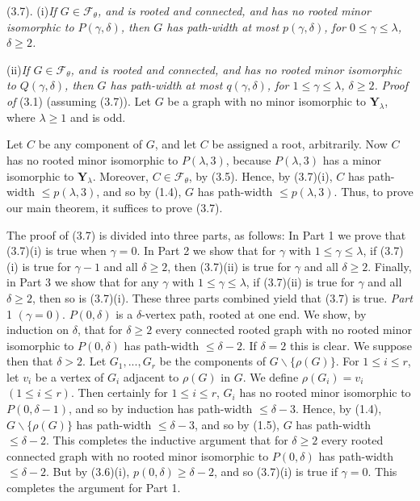 (3.7). (i)\enspace\textit{If $G\in\mathscr{F}_\theta$, and is rooted and connected, and has no rooted
minor isomorphic to $P(\gamma, \delta)$, then $G$ has path-width at most $p(\gamma, \delta)$, for
$0\le\gamma\le\lambda$, $\delta\ge 2$.}

\hspace*{12pt}(ii)\enspace\textit{If $G\in\mathscr{F}_\theta$, and is rooted and connected, and has no rooted minor
isomorphic to $Q(\gamma, \delta)$, then $G$ has path-width at most $q(\gamma, \delta)$, for $1\le\gamma\le\lambda$,
$\delta\ge 2$.}
\stmt
\textit{Proof of} (3.1) (assuming (3.7)). Let $G$ be a graph with no minor
isomorphic to $\mathbf{Y}_\lambda$, where $\lambda\ge 1$ and is odd.

Let $C$ be any component of $G$, and let $C$ be assigned a root, arbitrarily.
Now $C$ has no rooted minor isomorphic to $P(\lambda, 3)$, because $P(\lambda, 3)$ has a
minor isomorphic to $\mathbf{Y}_\lambda$. Moreover, $C\in\mathscr{F}_\theta$, by (3.5). Hence, by (3.7)(i), $C$
has path-width $\le p(\lambda, 3)$, and so by (1.4), $G$ has path-width $\le p(\lambda, 3)$.
\stmt
Thus, to prove our main theorem, it suffices to prove (3.7).

The proof of (3.7) is divided into three parts, as follows: In Part 1 we
prove that (3.7)(i) is true when $\gamma=0$. In Part 2 we show that for $\gamma$ with
$1\le\gamma\le\lambda$, if (3.7)(i) is true for $\gamma-1$ and all $\delta\ge 2$, then (3.7)(ii) is true for $\gamma$
and all $\delta\ge 2$. Finally, in Part 3 we show that for any $\gamma$ with $1\le\gamma\le\lambda$, if
(3.7)(ii) is true for $\gamma$ and all $\delta\ge 2$, then so is (3.7)(i). These three parts
combined yield that (3.7) is true.
\stmt
\textit{Part} 1 $(\gamma=0)$. $P(0, \delta)$ is a $\delta$-vertex path, rooted at one end. We show, by
induction on $\delta$, that for $\delta\ge 2$ every connected rooted graph with no rooted
minor isomorphic to $P(0, \delta)$ has path-width $\le\delta-2$. If $\delta=2$ this is clear.
We suppose then that $\delta>2$. Let $G_1,..., G_r$ be the components of $G\backslash\{\rho(G)\}$.
For $1\le i\le r$, let $v_i$ be a vertex of $G_i$ adjacent to $\rho(G)$ in $G$. We define
$\rho(G_i)=v_i$ $(1\le i\le r)$. Then certainly for $1\le i\le r$, $G_i$ has no rooted minor
isomorphic to $P(0, \delta-1)$, and so by induction has path-width $\le\delta-3$.
Hence, by (1.4), $G\backslash\{\rho(G)\}$ has path-width $\le\delta-3$, and so by (1.5), $G$ has
path-width $\le\delta-2$. This completes the inductive argument that for $\delta\ge 2$
every rooted connected graph with no rooted minor isomorphic to $P(0, \delta)$
has path-width $\le\delta-2$. But by (3.6)(i), $p(0, \delta)\ge\delta-2$, and so (3.7)(i) is
true if $\gamma=0$. This completes the argument for Part 1.

